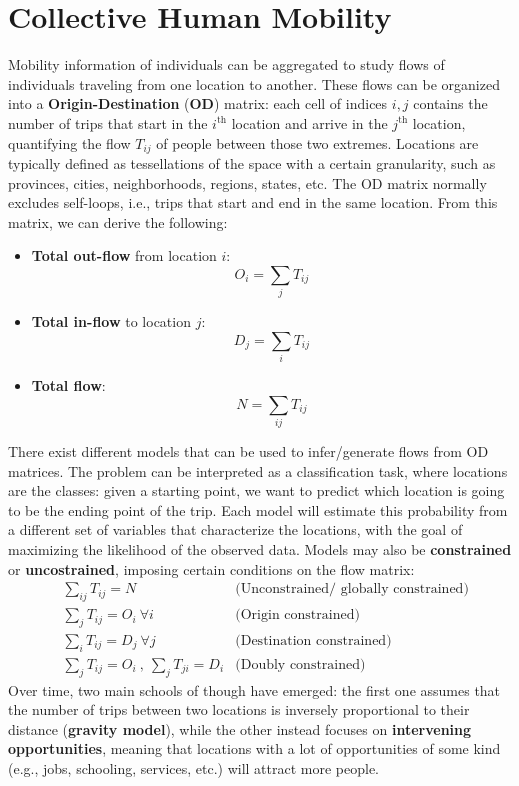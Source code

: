 \section{Collective Human Mobility}

Mobility information of individuals can be aggregated to study flows of individuals traveling from one location to another. These flows can be organized into a \textbf{Origin-Destination} (\textbf{OD}) matrix: each cell of indices $i,j$ contains the number of trips that start in the $i^{\text{th}}$ location and arrive in the $j^{\text{th}}$ location, quantifying the flow $T_{ij}$ of people between those two extremes. Locations are typically defined as tessellations of the space with a certain granularity, such as provinces, cities, neighborhoods, regions, states, etc. The OD matrix normally excludes self-loops, i.e., trips that start and end in the same location. From this matrix, we can derive the following:
\begin{itemize}
    \item \textbf{Total out-flow} from location $i$:
    \begin{equation*}
        O_i = \sum_j T_{ij}
    \end{equation*}
    \item \textbf{Total in-flow} to location $j$:
    \begin{equation*}
        D_j = \sum_i T_{ij}
    \end{equation*}
    \item \textbf{Total flow}:
    \begin{equation*}
        N = \sum_{ij} T_{ij}
    \end{equation*}
\end{itemize}

There exist different models that can be used to infer/generate flows from OD matrices. The problem can be interpreted as a classification task, where locations are the classes: given a starting point, we want to predict which location is going to be the ending point of the trip. Each model will estimate this probability from a different set of variables that characterize the locations, with the goal of maximizing the likelihood of the observed data. Models may also be \textbf{constrained} or \textbf{uncostrained}, imposing certain conditions on the flow matrix:
\begin{align*}
    &\sum_{ij} T_{ij} = N & \text{(Unconstrained/ globally constrained)} \\
    &\sum_j T_{ij} = O_i \ \forall i &\text{(Origin constrained)} \\
    &\sum_i T_{ij} = D_j \ \forall j &\text{(Destination constrained)} \\
    &\sum_j T_{ij} = O_i \ , \ \sum_j T_{ji} = D_i &\text{(Doubly constrained)}
\end{align*}
Over time, two main schools of though have emerged: the first one assumes that the number of trips between two locations is inversely proportional to their distance (\textbf{gravity model}), while the other instead focuses on \textbf{intervening opportunities}, meaning that locations with a lot of opportunities of some kind (e.g., jobs, schooling, services, etc.) will attract more people.

